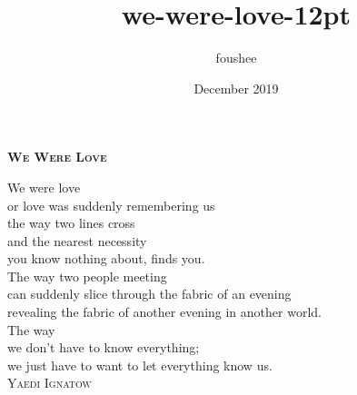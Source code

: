 \documentclass[14pt]{memoir}
\title{we-were-love-12pt}
\author{foushee }
\date{December 2019}
\begin{document}
\thispagestyle{empty}
\textbf{\textsc{\large We Were Love}}
\vspace{26pt}

We were love\\
or love was suddenly remembering us\\
the way two lines cross\\
and the nearest necessity\\
you know nothing about, finds you.\\
The way two people meeting\\
can suddenly slice through the fabric of an evening\\
revealing the fabric of another evening in another world.\\
The way\\
we don’t have to know everything;\\
we just have to want to let everything know us.\\

\vspace{11pt}
\hspace{90pt} \textsc{Yaedi Ignatow}\\
\vfill
\end{document}
